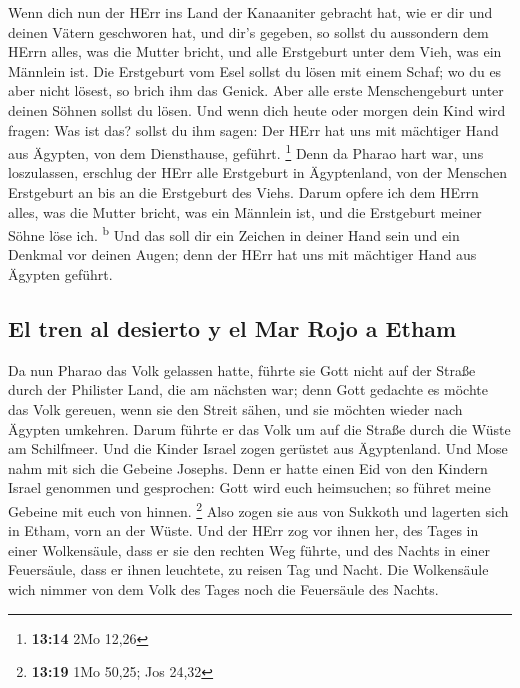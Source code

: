  Wenn dich nun der HErr ins Land der Kanaaniter gebracht
hat, wie er dir und deinen Vätern geschworen hat, und dir's gegeben,
 so sollst du aussondern dem HErrn alles, was die Mutter
bricht, und alle Erstgeburt unter dem Vieh, was ein Männlein ist.
 Die Erstgeburt vom Esel sollst du lösen mit einem Schaf;
wo du es aber nicht lösest, so brich ihm das Genick. Aber alle erste
Menschengeburt unter deinen Söhnen sollst du lösen.  Und
wenn dich heute oder morgen dein Kind wird fragen: Was ist das? sollst
du ihm sagen: Der HErr hat uns mit mächtiger Hand aus Ägypten, von dem
Diensthause, geführt. \footnote{\textbf{13:14} 2Mo 12,26}
 Denn da Pharao hart war, uns loszulassen, erschlug der
HErr alle Erstgeburt in Ägyptenland, von der Menschen Erstgeburt an bis
an die Erstgeburt des Viehs. Darum opfere ich dem HErrn alles, was die
Mutter bricht, was ein Männlein ist, und die Erstgeburt meiner Söhne
löse ich. \textsuperscript{b}  Und das soll dir ein
Zeichen in deiner Hand sein und ein Denkmal vor deinen Augen; denn der
HErr hat uns mit mächtiger Hand aus Ägypten geführt.

\hypertarget{el-tren-al-desierto-y-el-mar-rojo-a-etham}{%
\subsection{El tren al desierto y el Mar Rojo a
Etham}\label{el-tren-al-desierto-y-el-mar-rojo-a-etham}}

 Da nun Pharao das Volk gelassen hatte, führte sie Gott
nicht auf der Straße durch der Philister Land, die am nächsten war; denn
Gott gedachte es möchte das Volk gereuen, wenn sie den Streit sähen, und
sie möchten wieder nach Ägypten umkehren.  Darum führte
er das Volk um auf die Straße durch die Wüste am Schilfmeer. Und die
Kinder Israel zogen gerüstet aus Ägyptenland.  Und Mose
nahm mit sich die Gebeine Josephs. Denn er hatte einen Eid von den
Kindern Israel genommen und gesprochen: Gott wird euch heimsuchen; so
führet meine Gebeine mit euch von hinnen. \footnote{\textbf{13:19} 1Mo
  50,25; Jos 24,32}  Also zogen sie aus von Sukkoth und
lagerten sich in Etham, vorn an der Wüste.  Und der HErr
zog vor ihnen her, des Tages in einer Wolkensäule, dass er sie den
rechten Weg führte, und des Nachts in einer Feuersäule, dass er ihnen
leuchtete, zu reisen Tag und Nacht.  Die Wolkensäule wich
nimmer von dem Volk des Tages noch die Feuersäule des Nachts.

